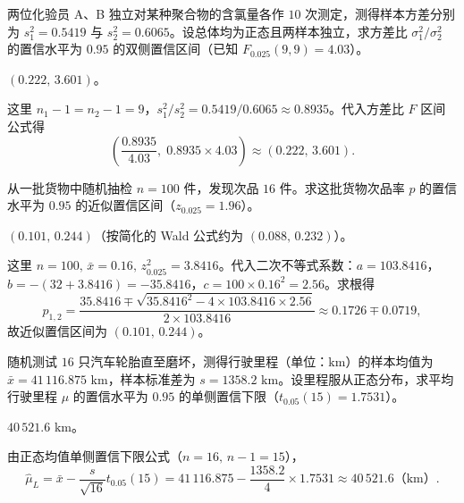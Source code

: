 \begin{exercise}
两位化验员 A、B 独立对某种聚合物的含氯量各作 $10$ 次测定，测得样本方差分别为 $s_1^2=0.5419$ 与 $s_2^2=0.6065$。设总体均为正态且两样本独立，求方差比 $\sigma_1^2/\sigma_2^2$ 的置信水平为 $0.95$ 的双侧置信区间（已知 $F_{0.025}(9,9)=4.03$）。
\begin{answer}
$(0.222,\,3.601)$。
\end{answer}
\begin{solution}
这里 $n_1-1=n_2-1=9$，$s_1^2/s_2^2=0.5419/0.6065\approx 0.8935$。代入方差比 $F$ 区间公式得
\[
  \left(\frac{0.8935}{4.03},\;0.8935\times 4.03\right)\approx(0.222,\,3.601).
\]
\end{solution}
\end{exercise}

\begin{exercise}
从一批货物中随机抽检 $n=100$ 件，发现次品 $16$ 件。求这批货物次品率 $p$ 的置信水平为 $0.95$ 的近似置信区间（$z_{0.025}=1.96$）。
\begin{answer}
$(0.101,\,0.244)$（按简化的 Wald 公式约为 $(0.088,\,0.232)$）。
\end{answer}
\begin{solution}
这里 $n=100,\,\bar{x}=0.16,\,z_{0.025}^2=3.8416$。代入二次不等式系数：$a=103.8416$，$b=-(32+3.8416)=-35.8416$，$c=100\times 0.16^2=2.56$。求根得
\[
  p_{1,2}=\frac{35.8416\mp\sqrt{35.8416^2-4\times 103.8416\times 2.56}}{2\times 103.8416}
  \approx 0.1726\mp 0.0719,
\]
故近似置信区间为 $(0.101,\,0.244)$。
\end{solution}
\end{exercise}

\begin{exercise}
随机测试 $16$ 只汽车轮胎直至磨坏，测得行驶里程（单位：$\mathrm{km}$）的样本均值为 $\bar{x}=41\,116.875\text{ km}$，样本标准差为 $s=1358.2\text{ km}$。设里程服从正态分布，求平均行驶里程 $\mu$ 的置信水平为 $0.95$ 的单侧置信下限（$t_{0.05}(15)=1.7531$）。
\begin{answer}
$40\,521.6\text{ km}$。
\end{answer}
\begin{solution}
由正态均值单侧置信下限公式（$n=16,\,n-1=15$），
\[
  \hat{\mu}_L=\bar{x}-\frac{s}{\sqrt{16}}t_{0.05}(15)
  =41\,116.875-\frac{1358.2}{4}\times 1.7531\approx 40\,521.6\text{（km）}.
\]
\end{solution}
\end{exercise}
